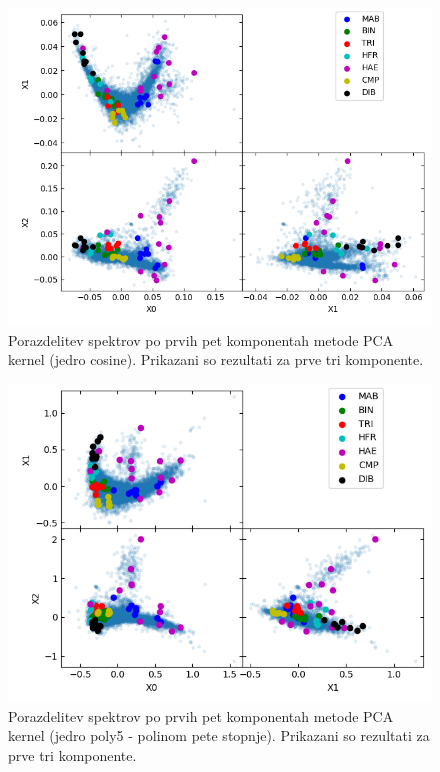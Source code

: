 \documentclass[11pt,a4paper]{article}
\begin{document}
\begin{figure}[h]
    \centering
    \hbox{\hspace{6em}\includegraphics[scale=0.7]{PCA_klasifikacija_cosine}}
    \caption{Porazdelitev spektrov po prvih pet komponentah metode PCA kernel (jedro cosine). Prikazani so rezultati za prve tri komponente.}
    \label{6}
\end{figure}

\begin{figure}[h]
    \centering
    \hbox{\hspace{6em}\includegraphics[scale=0.7]{PCA_klasifikacija_poly5}}
    \caption{Porazdelitev spektrov po prvih pet komponentah metode PCA kernel (jedro poly5 - polinom pete stopnje). Prikazani so rezultati za prve tri komponente.}
    \label{7}
\end{figure}
\end{document}
